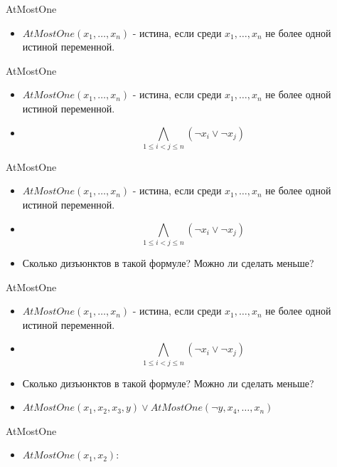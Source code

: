 \documentclass{beamer}
\begin{document}
\begin{frame}{AtMostOne}
\begin{itemize}
\item $AtMostOne(x_1, \dots, x_n)$ - истина, если среди $x_1, \dots, x_n$ не более одной истиной переменной.
\end{itemize}
\end{frame}

\begin{frame}{AtMostOne}
\begin{itemize}
\item $AtMostOne(x_1, \dots, x_n)$ - истина, если среди $x_1, \dots, x_n$ не более одной истиной переменной.
\item \[\bigwedge_{1 \le i < j \le n}(\lnot x_i \vee \lnot x_j)\]
\end{itemize}
\end{frame}

\begin{frame}{AtMostOne}
\begin{itemize}
\item $AtMostOne(x_1, \dots, x_n)$ - истина, если среди $x_1, \dots, x_n$ не более одной истиной переменной.
\item \[\bigwedge_{1 \le i < j \le n}(\lnot x_i \vee \lnot x_j)\]
\item Сколько дизъюнктов в такой формуле? Можно ли сделать меньше?
\end{itemize}
\end{frame}

\begin{frame}{AtMostOne}
\begin{itemize}
\item $AtMostOne(x_1, \dots, x_n)$ - истина, если среди $x_1, \dots, x_n$ не более одной истиной переменной.
\item \[\bigwedge_{1 \le i < j \le n}(\lnot x_i \vee \lnot x_j)\]
\item Сколько дизъюнктов в такой формуле? Можно ли сделать меньше?
\item $AtMostOne(x_1, x_2, x_3, y) \vee AtMostOne(\lnot y, x_4, \dots, x_n)$
\end{itemize}
\end{frame}

\begin{frame}{AtMostOne}
\begin{itemize}
\item $AtMostOne(x_1, x_2)$:\newline
\end{itemize}
\end{frame}
\end{document}
